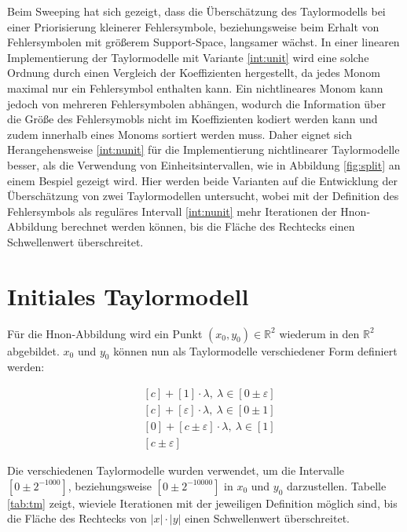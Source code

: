 Beim Sweeping hat sich gezeigt, dass die Überschätzung des Taylormodells bei einer Priorisierung kleinerer Fehlersymbole, beziehungsweise beim Erhalt von Fehlersymbolen mit größerem Support-Space, langsamer wächst. In einer linearen Implementierung der Taylormodelle mit Variante \ref{int:unit} wird eine solche Ordnung durch einen Vergleich der Koeffizienten hergestellt, da jedes Monom maximal nur ein Fehlersymbol enthalten kann. Ein nichtlineares Monom kann jedoch von mehreren Fehlersymbolen abhängen, wodurch die Information über die Größe des Fehlersymobls nicht im Koeffizienten kodiert werden kann und zudem innerhalb eines Monoms sortiert werden muss. Daher eignet sich Herangehensweise \ref{int:nunit} für die Implementierung nichtlinearer Taylormodelle besser, als die Verwendung von Einheitsintervallen, wie in Abbildung \ref{fig:split} an einem Bespiel gezeigt wird. Hier werden beide Varianten auf die Entwicklung der Überschätzung von zwei Taylormodellen untersucht, wobei mit der Definition des Fehlersymbols als reguläres Intervall \ref{int:nunit} mehr Iterationen der H\e non-Abbildung berechnet werden können, bis die Fläche des Rechtecks einen Schwellenwert überschreitet.
 
 
 \section{Initiales Taylormodell}
 
 Für die H\e non-Abbildung wird ein Punkt $(x_0,y_0) \in \mathbb{R}^2$ wiederum in den $\mathbb{R}^2$ abgebildet. $x_0$ und $y_0$ können nun als Taylormodelle verschiedener Form definiert werden:
 
 
 \begin{align}
  &[c] + [1] \cdot \lambda,\  \lambda \in [0 \pm \varepsilon] \label{tm1}\\
  &[c] + [\varepsilon] \cdot \lambda,\ \lambda \in [0 \pm 1] \label{tm2}\\
  &[0] + [c \pm \varepsilon] \cdot \lambda,\ \lambda \in [1] \label{tm3}\\
  &[c \pm \varepsilon]\label{tm4} 
 \end{align}


Die verschiedenen Taylormodelle wurden verwendet, um die Intervalle $[0 \pm 2^{-1000}]$, beziehungsweise $[0\pm 2^{-10000}]$ in $x_0$ und $y_0$ darzustellen. Tabelle \ref{tab:tm} zeigt, wieviele Iterationen mit der jeweiligen Definition möglich sind, bis die Fläche des Rechtecks von $|x|\cdot|y|$ einen Schwellenwert überschreitet.
 
